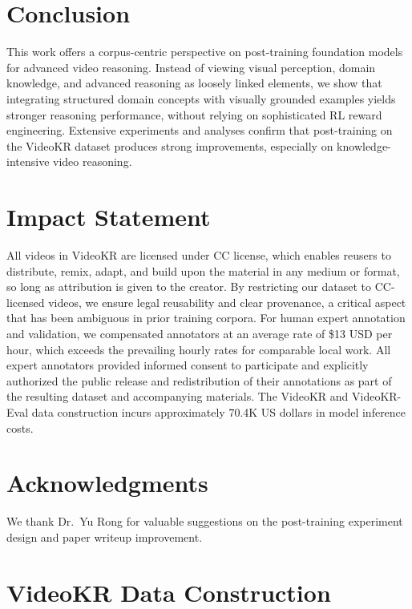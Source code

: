 \documentclass{llmxive}
\providecommand{\eval}{VideoKR-Eval\xspace}
\providecommand{\ours}{VideoKR\xspace}
\begin{document}
\section{Conclusion}
This work offers a corpus-centric perspective on post-training foundation models for advanced video reasoning. Instead of viewing visual perception, domain knowledge, and advanced reasoning as loosely linked elements, we show that integrating structured domain concepts with visually grounded examples yields stronger reasoning performance, without relying on sophisticated RL reward engineering. Extensive experiments and analyses confirm that post-training on the \ours dataset produces strong improvements, especially on knowledge-intensive video reasoning.

\section*{Impact Statement}
All videos in \ours are licensed under CC license, which enables reusers to distribute, remix, adapt, and build upon the material in any medium or format, so long as attribution is given to the creator. By restricting our dataset to CC-licensed videos, we ensure legal reusability and clear provenance, a critical aspect that has been ambiguous in prior training corpora. 
For human expert annotation and validation, we compensated annotators at an average rate of \$13 USD per hour, which exceeds the prevailing hourly rates for comparable local work.
All expert annotators provided informed consent to participate and explicitly authorized the public release and redistribution of their annotations as part of the resulting dataset and accompanying materials.
The \ours and \eval data construction incurs approximately 70.4K US dollars in model inference costs.

\section*{Acknowledgments}
We thank Dr.~Yu Rong for valuable suggestions on the post-training experiment design and paper writeup improvement.







\appendix






\section{\ours Data Construction}
\end{document}

